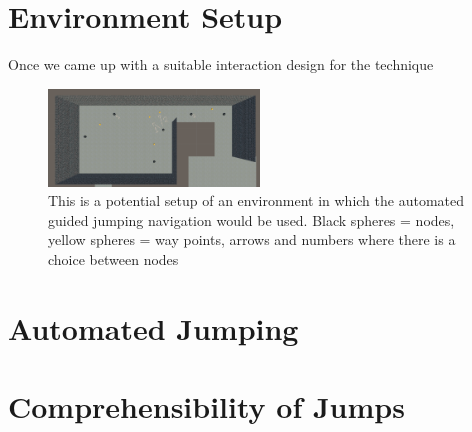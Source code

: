 \section{Environment Setup}
\label{section AGJ: Environment Setup}

Once we came up with a suitable interaction design for the technique
\begin{figure}[]
	\centering
	\includegraphics[width=0.5\textwidth]{images/interaction-design-layout.png} %
	\caption{This is a potential setup of an environment in which the automated guided jumping navigation would be used. Black spheres = nodes, yellow spheres = way points, arrows and numbers where there is a choice between nodes}
	\label{fig:interaction-design-layout}
\end{figure}
\section{Automated Jumping}
\label{section AGJ: Automated Jumping}
\section{Comprehensibility of Jumps}
\label{section AGJ: Comprehensibility of Jumps}